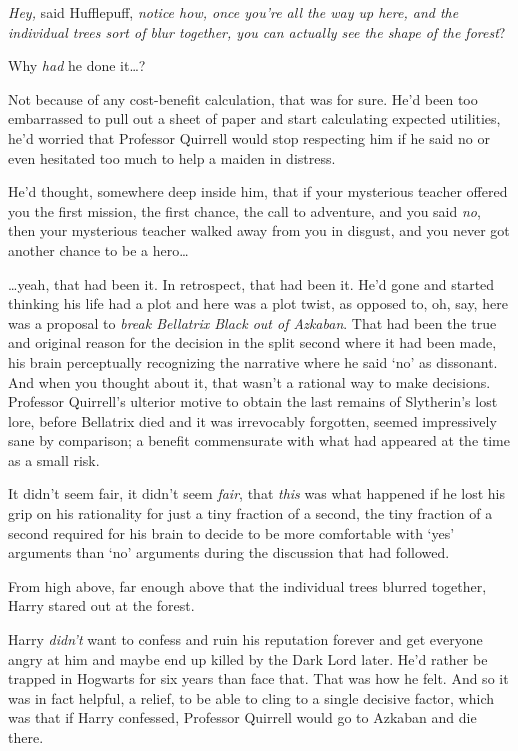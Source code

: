 \emph{Hey,} said Hufflepuff, \emph{notice how, once you're all the way up here, and the individual trees sort of blur together, you can actually see the shape of the forest}?

Why \emph{had} he done it{\ldots}?

Not because of any cost-benefit calculation, that was for sure. He'd been too embarrassed to pull out a sheet of paper and start calculating expected utilities, he'd worried that Professor Quirrell would stop respecting him if he said no or even hesitated too much to help a maiden in distress.

He'd thought, somewhere deep inside him, that if your mysterious teacher offered you the first mission, the first chance, the call to adventure, and you said \emph{no}, then your mysterious teacher walked away from you in disgust, and you never got another chance to be a hero{\ldots}

{\ldots}yeah, that had been it. In retrospect, that had been it. He'd gone and started thinking his life had a plot and here was a plot twist, as opposed to, oh, say, here was a proposal to \emph{break Bellatrix Black out of Azkaban}. That had been the true and original reason for the decision in the split second where it had been made, his brain perceptually recognizing the narrative where he said `no' as dissonant. And when you thought about it, that wasn't a rational way to make decisions. Professor Quirrell's ulterior motive to obtain the last remains of Slytherin's lost lore, before Bellatrix died and it was irrevocably forgotten, seemed impressively sane by comparison; a benefit commensurate with what had appeared at the time as a small risk.

It didn't seem fair, it didn't seem \emph{fair}, that \emph{this} was what happened if he lost his grip on his rationality for just a tiny fraction of a second, the tiny fraction of a second required for his brain to decide to be more comfortable with `yes' arguments than `no' arguments during the discussion that had followed.

From high above, far enough above that the individual trees blurred together, Harry stared out at the forest.

Harry \emph{didn't} want to confess and ruin his reputation forever and get everyone angry at him and maybe end up killed by the Dark Lord later. He'd rather be trapped in Hogwarts for six years than face that. That was how he felt. And so it was in fact helpful, a relief, to be able to cling to a single decisive factor, which was that if Harry confessed, Professor Quirrell would go to Azkaban and die there.

